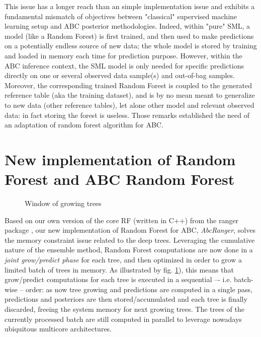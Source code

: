 \documentclass[long, final]{jobim}
\begin{document}
This issue has a longer reach than an simple implementation issue and exhibits a fundamental mismatch of objectives between "classical" supervised machine learning setup and ABC posterior methodologies. Indeed, within "pure" SML, a model (like a Random Forest) is first trained, and then used to make predictions on a potentially endless source of new data; the whole model is stored by training and loaded in memory each time for prediction purpose. However, within the ABC inference context, the SML model is only needed for specific predictions directly on one or several observed data sample(s) and out-of-bag samples. Moreover, the corresponding trained Random Forest is coupled to the generated reference table (aka the training dataset), and is by no mean meant to generalize to new data (other reference tables), let alone other model and relevant observed data: in fact storing the forest is useless. Those remarks established the need of an adaptation of random forest algorithm for ABC.

\section{New implementation of Random Forest and ABC Random Forest}
\label{sec:new}

\begin{figure}
  \begin{center}
    \setlength{\unitlength}{5mm}
    
  \end{center}
  \caption{Window of growing trees}
  \label{fig:rf-optim}
\end{figure}

Based on our own version of the core RF (written in C++) from the ranger package \cite{wright2015ranger}, our new implementation of Random Forest for ABC, \emph{AbcRanger}, solves the memory constraint issue related to the deep trees. Leveraging the cumulative nature of the ensemble method, Random Forest computations are now done in a \emph{joint grow/predict phase} for each tree, and then optimized in order to grow a limited batch of trees in memory. As illustrated by fig. \ref{fig:rf-optim}), this means that grow/predict computations for each tree is executed in a sequential –- i.e. batch-wise --  order: as now tree growing and predictions are computed in a single pass, predictions and posteriors are then stored/accumulated and each tree is finally discarded, freeing the system memory for next growing trees. The trees of the currently processed batch are still computed in parallel to leverage nowadays ubiquitous multicore architectures. 
\end{document}
